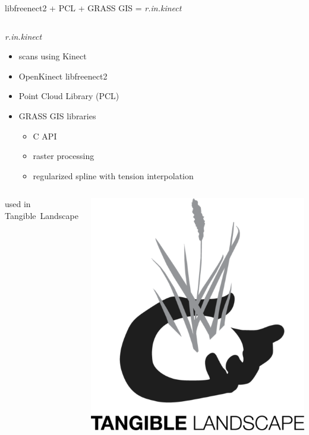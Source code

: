 \documentclass[xcolor={dvipsnames,usenames},beamer,aspectratio=169]{beamer}
\newcommand{\module}[1]{\emph{#1}}
\begin{document}
\begin{frame}{libfreenect2 + PCL + GRASS GIS = \module{r.in.kinect}}

\begin{columns}
\begin{column}{0.5\textwidth}

\begin{block}{\module{r.in.kinect}}
 \begin{itemize}
  \item scans using Kinect
  \item OpenKinect libfreenect2
  \item Point Cloud Library (PCL)
  \item GRASS GIS libraries
  \begin{itemize}
    \item C API
    \item raster processing
    \item regularized spline with tension interpolation
  \end{itemize}
 \end{itemize}
\end{block}

\begin{columns}
\begin{column}{0.6\textwidth}
\small

used in Tangible~Landscape

\end{column}
\begin{column}{0.2\textwidth}

\includegraphics[width=\textwidth]{logos/tangible_landscape}


\end{column}
\end{columns}
\end{column}
\end{columns}
\end{frame}
\end{document}
